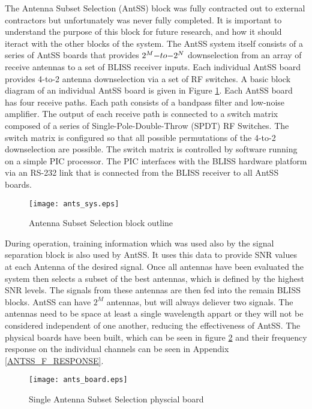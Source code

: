 The Antenna Subset Selection (AntSS) block was fully contracted out to external contractors but unfortunately was never fully completed.  It is important to understand the purpose of this block for future research, and how it should iteract with the other blocks of the system.  The AntSS system itself consists of a series of AntSS boards that provides \(2^{M}$$ -to-$$2^{N}\) downselection from an array of receive antennas to a set of BLISS receiver inputs. Each individual AntSS board provides 4-to-2 antenna downselection via a set of RF switches. A basic block diagram of an individual AntSS board is given in Figure \ref{ants_sys}.  Each AntSS board has four receive paths. Each path consists of a bandpass filter and low-noise amplifier. The output of each receive path is connected to a switch matrix composed of a series of Single-Pole-Double-Throw (SPDT) RF Switches. The switch matrix is configured so that all possible permutations of the 4-to-2 downselection are possible. The switch matrix is controlled by software running on a simple PIC processor. The PIC interfaces with the BLISS hardware platform via an RS-232 link that is connected from the BLISS receiver to all AntSS boards.\\

\begin{figure}[!ht]\label{ants_sys}
\centering
\texttt{[image: ants\_sys.eps]}
\caption{Antenna Subset Selection block outline}
\end{figure}

During operation, training information which was used also by the signal separation block is also used by AntSS.  It uses this data to provide SNR values at each Antenna of the desired signal.  Once all antennas have been evaluated the system then selects a subset of the best antennas, which is defined by the highest SNR levels.  The signals from these antennas are then fed into the remain BLISS blocks.  AntSS can have \(2^{M}\) antennas, but will always deliever two signals.  The antennas need to be space at least a single wavelength appart or they will not be considered independent of one another, reducing the effectiveness of AntSS.  The physical boards have been built, which can be seen in figure \ref{antss_boards} and their frequency response on the individual channels can be seen in Appendix \ref{ANTSS_F_RESPONSE}.\\

\begin{figure}[!ht]\label{antss_boards}
\centering
\texttt{[image: ants\_board.eps]}
\caption{Single Antenna Subset Selection physcial board}
\end{figure}

